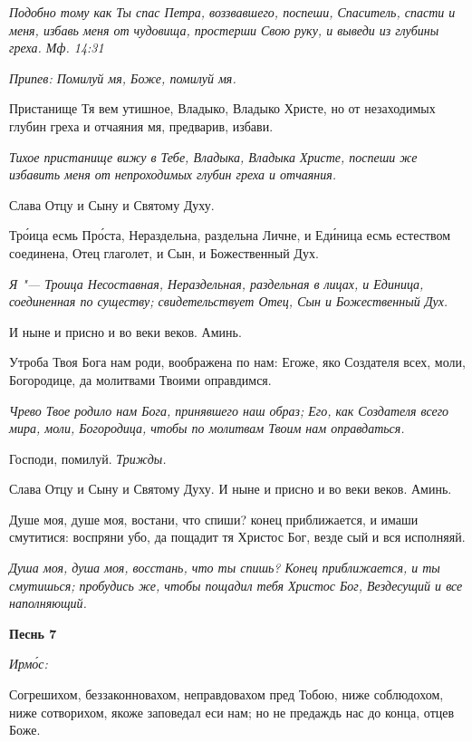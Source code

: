 \itshape Подобно тому как Ты спас Петра, воззвавшего, поспеши, Спаситель, спасти и меня, избавь меня от чудовища, простерши Свою руку, и выведи из глубины греха. Мф. 14:31\normalfont{}


\itshape Припев:\normalfont{} Помилуй мя, Боже, помилуй мя.


Пристанище Тя вем утишное, Владыко, Владыко Христе, но от незаходимых глубин греха и отчаяния мя, предварив, избави.


\itshape Тихое пристанище вижу в Тебе, Владыка, Владыка Христе, поспеши же избавить меня от непроходимых глубин греха и отчаяния.\normalfont{}


Слава Отцу и Сыну и Святому Духу.


Тро́ица есмь Про́ста, Нераздельна, раздельна Личне, и Еди́ница есмь естеством соединена, Отец глаголет, и Сын, и Божественный Дух.


\itshape Я "--- Троица Несоставная, Нераздельная, раздельная в лицах, и Единица, соединенная по существу; свидетельствует Отец, Сын и Божественный Дух.\normalfont{}


И ныне и присно и во веки веков. Аминь.


Утроба Твоя Бога нам роди, воображена по нам: Егоже, яко Создателя всех, моли, Богородице, да молитвами Твоими оправдимся.


\itshape Чрево Твое родило нам Бога, принявшего наш образ; Его, как Создателя всего мира, моли, Богородица, чтобы по молитвам Твоим нам оправдаться.\normalfont{}


Господи, помилуй. \itshape Трижды.\normalfont{}


Слава Отцу и Сыну и Святому Духу. И ныне и присно и во веки веков. Аминь.


Душе моя, душе моя, востани, что спиши? конец приближается, и имаши смутитися: воспряни убо, да пощадит тя Христос Бог, везде сый и вся исполняяй.


\itshape Душа моя, душа моя, восстань, что ты спишь? Конец приближается, и ты смутишься; пробудись же, чтобы пощадил тебя Христос Бог, Вездесущий и все наполняющий.\normalfont{}





\bfseries Песнь 7\normalfont{}


\itshape Ирмо́с:\normalfont{}


Согрешихом, беззаконновахом, неправдовахом пред Тобою, ниже соблюдохом, ниже сотворихом, якоже заповедал еси нам; но не предаждь нас до конца, отцев Боже.


